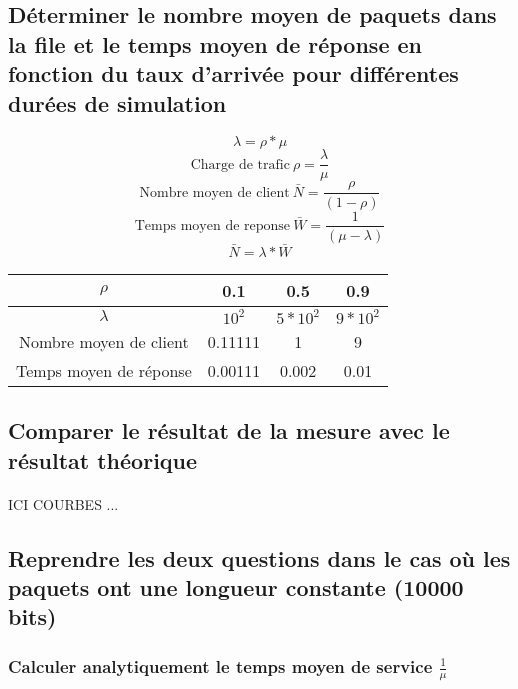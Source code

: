         \subsection{Déterminer le nombre moyen de paquets dans la file et le temps moyen de réponse en fonction du taux d'arrivée pour différentes durées de simulation}
\[  \lambda = \rho * \mu \]
\[  \text{Charge de trafic} \ \rho = \frac{\lambda}{\mu} \]
\[  \text{Nombre moyen de client} \ \bar{N} = \frac{\rho}{(1 - \rho)} \]
\[  \text{Temps moyen de reponse} \ \bar{W} = \frac{1}{(\mu - \lambda)} \]
\[  \bar{N} = \lambda * \bar{W} \]
\begin{tabular}{ | c | c| c | c | }
\hline
    $\rho$ & 0.1 & 0.5 & 0.9 \\
\hline
    $\lambda$ & $10^{2}$ & $5*10^{2}$ & $9*10^{2}$ \\
\hline
    Nombre moyen de client & 0.11111 & 1 & 9 \\
\hline
    Temps moyen de réponse & 0.00111 & 0.002 & 0.01 \\
\hline
\end{tabular}
%
        \subsection{Comparer le résultat de la mesure avec le résultat théorique}
            \paragraph{}
ICI COURBES ...
%
        \subsection{Reprendre les deux questions dans le cas où les paquets ont une longueur constante (10000 bits)}
%
            \subsubsection{Calculer analytiquement le temps moyen de service $\frac{1}{\mu}$}
%
